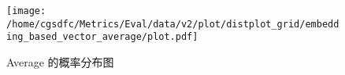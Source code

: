 \begin{figure}[H]%
\centering%
\texttt{[image: /home/cgsdfc/Metrics/Eval/data/v2/plot/distplot\_grid/embedding\_based\_vector\_average/plot.pdf]}%
\caption{Average 的概率分布图}%
\label{fig:Averagedist}%
\end{figure}